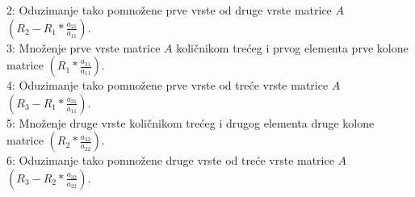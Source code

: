 \documentclass[11pt]{article}
\begin{document}
2: Oduzimanje tako pomnožene prve vrste od druge vrste matrice $A$ $(R_2 - R_1*\frac{\displaystyle{a_{21}}}{\displaystyle{a_{11}}})$.\\
3: Množenje prve vrste matrice $A$ količnikom trećeg i prvog elementa prve kolone matrice $(R_1*\frac{\displaystyle{a_{31}}}{\displaystyle{a_{11}}})$.\\
4: Oduzimanje tako pomnožene prve vrste od treće vrste matrice $A$ $(R_3 - R_1*\frac{\displaystyle{a_{31}}}{\displaystyle{a_{11}}})$.\\
5: Množenje druge vrste  količnikom trećeg i drugog elementa druge kolone matrice $(R_2*\frac{\displaystyle{a_{32}}}{\displaystyle{a_{22}}})$.\\
6: Oduzimanje tako pomnožene druge vrste od treće vrste matrice $A$ $(R_3 - R_2*\frac{\displaystyle{a_{32}}}{\displaystyle{a_{22}}})$.\\
\end{document}
